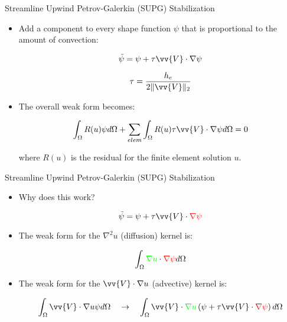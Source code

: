 \documentclass{beamer}
\begin{document}
\begin{frame}{Streamline Upwind Petrov-Galerkin (SUPG) Stabilization}

\begin{itemize}
\item Add a component to every shape function \(\psi\) that is proportional to the amount of convection:

\begin{equation}
\tilde{\psi}=\psi+\tau\vv{V}\cdot\nabla \psi
\end{equation}

\begin{equation}
\tau=\frac{h_e}{2\|\vv{V}\|_2}
\end{equation}

\item The overall weak form becomes:

\begin{equation}
\int_{\Omega}R(u)\psi d\Omega+\sum_{elem}\int_{\Omega}R(u)\tau\vv{V}\cdot\nabla \psi d\Omega=0
\end{equation}

where \(R(u)\) is the residual for the finite element solution \(u\).
\end{itemize}
\end{frame}

\begin{frame}{Streamline Upwind Petrov-Galerkin (SUPG) Stabilization}
\begin{itemize}
\item Why does this work?

\begin{equation}
\tilde{\psi}=\psi+\tau\vv{V}\cdot\color{red}\nabla \psi\color{black}
\end{equation}

\item The weak form for the \(\nabla^2 u\) (diffusion) kernel is:

\begin{equation}
\int_{\Omega}^{}\color{green}\nabla u\color{black}\cdot\color{red}\nabla\psi\color{black} d\Omega
\end{equation}

\item The weak form for the \(\vv{V}\cdot\nabla u\) (advective) kernel is:

\begin{equation}
\int_{\Omega}^{}\vv{V}\cdot\nabla u\psi d\Omega\quad\rightarrow\quad\int_{\Omega}^{}\vv{V}\cdot\color{green}\nabla u\color{black}\left(\psi+\tau\vv{V}\cdot\color{red}\nabla \psi\color{black}\right) d\Omega
\end{equation}
\end{itemize}

\end{frame}
\end{document}
